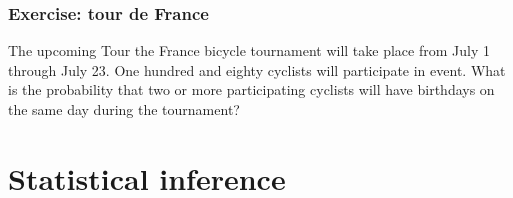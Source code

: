 \begin{frame}
    \frametitle{Exercise: tour de France}

    \begin{manualProbExample}{8.6}
        The upcoming Tour the France bicycle tournament will take place from
        July 1 through July 23. One hundred and eighty cyclists will
        participate in event. What is the probability that two or more
        participating cyclists will have birthdays on the same day during the
        tournament?
    \end{manualProbExample}

\end{frame}

\section{Statistical inference}

